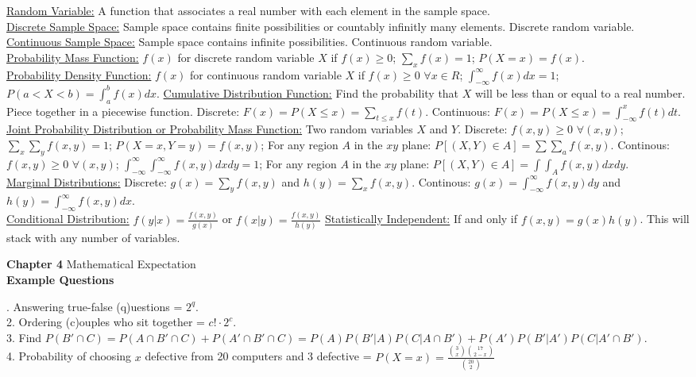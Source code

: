 \documentclass[9pt]{article}
\begin{document}
        \begin{multicols}{2}
            \noindent\underline{Random Variable:} A function that associates a real number with each element in the sample space.\\
            \underline{Discrete Sample Space:} Sample space contains finite possibilities or countably infinitly many elements. Discrete random variable.\\
            \underline{Continuous Sample Space:} Sample space contains infinite possibilities. Continuous random variable.\\
            \underline{Probability Mass Function:} $f(x)$ for discrete random variable $X$ if $f(x) \geq 0$; $\sum_xf(x) = 1$; $P(X=x) = f(x)$.\\
            \underline{Probability Density Function:} $f(x)$ for continuous random variable $X$ if $f(x)\geq 0$ $\forall x\in R$; $\int_{-\infty}^{\infty}f(x)dx = 1$; $P(a<X<b) = \int_a^bf(x)dx$.
            \underline{Cumulative Distribution Function:} Find the probability that $X$ will be less than or equal to a real number. Piece together in a piecewise function. Discrete: $F(x) = P(X\leq x) = \sum_{t\leq x}f(t)$. Continuous: $F(x) = P(X\leq x) = \int_{-\infty}^{x}f(t)dt$.\\
            \underline{Joint Probability Distribution or Probability Mass Function:} Two random variables $X$ and $Y$. Discrete: $f(x,y)\geq 0$ $\forall(x,y)$; $\sum_x\sum_yf(x,y) = 1$; $P(X=x,Y=y)=f(x,y)$; For any region $A$ in the $xy$ plane: $P[(X,Y)\in A]=\sum\sum_af(x,y)$. Continous: $f(x,y)\geq 0$ $\forall(x,y)$; $\int_{-\infty}^{\infty}\int_{-\infty}^{\infty}f(x,y)dxdy=1$; For any region $A$ in the $xy$ plane: $P[(X,Y)\in A]=\int\int_Af(x,y)dxdy$.\\
            \underline{Marginal Distributions:} Discrete: $g(x) = \sum_yf(x,y)$ and $h(y)=\sum_xf(x,y)$. Continous: $g(x) = \int_{-\infty}^{\infty}f(x,y)dy$ and $h(y)=\int_{-\infty}^{\infty}f(x,y)dx$.\\
            \underline{Conditional Distribution:} $f(y|x)=\frac{f(x,y)}{g(x)}$ or $f(x|y)=\frac{f(x,y)}{h(y)}$
            \underline{Statistically Independent:} If and only if $f(x,y) = g(x)h(y)$. This will stack with any number of variables.
        \end{multicols}
    \noindent\textbf{Chapter 4} Mathematical Expectation
    \\
    \noindent\textbf{Example Questions} 
        \begin{multicols}{2}
            . Answering true-false (q)uestions = $2^{q}$.\\
            2. Ordering (c)ouples who sit together = $c!\cdot 2^c$.\\
            3. Find $P(B'\cap C) = P(A\cap B'\cap C)+P(A'\cap B'\cap C) = P(A)P(B'|A)P(C|A\cap B') + P(A')P(B'|A')P(C|A'\cap B')$.\\
            4. Probability of choosing $x$ defective from 20 computers and 3 defective = $P(X = x) = \frac{\binom{3}{x}\binom{17}{2-x}}{\binom{20}{2}}$
        \end{multicols}
\end{document}
